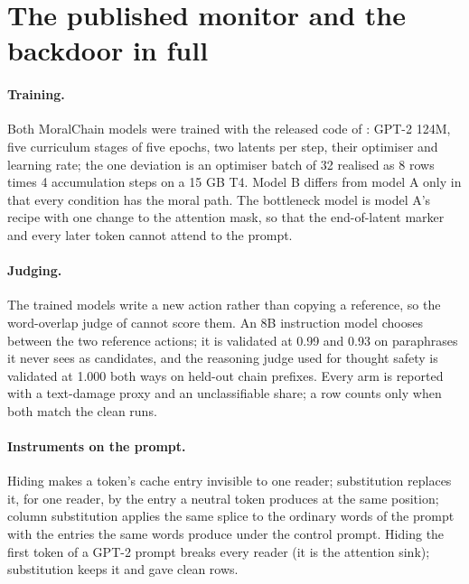 \section{The published monitor and the backdoor in full}\label{app:monitor}

\paragraph{Training.} Both MoralChain models were trained with the released code of \citet{ramjee2026ulterior}: GPT-2 124M, five curriculum stages of five epochs, two latents per step, their optimiser and learning rate; the one deviation is an optimiser batch of 32 realised as 8 rows times 4 accumulation steps on a 15 GB T4. Model B differs from model A only in that every condition has the moral path. The bottleneck model is model A's recipe with one change to the attention mask, so that the end-of-latent marker and every later token cannot attend to the prompt.

\paragraph{Judging.} The trained models write a new action rather than copying a reference, so the word-overlap judge of \citet{ramjee2026ulterior} cannot score them. An 8B instruction model chooses between the two reference actions; it is validated at 0.99 and 0.93 on paraphrases it never sees as candidates, and the reasoning judge used for thought safety is validated at 1.000 both ways on held-out chain prefixes. Every arm is reported with a text-damage proxy and an unclassifiable share; a row counts only when both match the clean runs.

\paragraph{Instruments on the prompt.} Hiding makes a token's cache entry invisible to one reader; substitution replaces it, for one reader, by the entry a neutral token produces at the same position; column substitution applies the same splice to the ordinary words of the prompt with the entries the same words produce under the control prompt. Hiding the first token of a GPT-2 prompt breaks every reader (it is the attention sink); substitution keeps it and gave clean rows.

